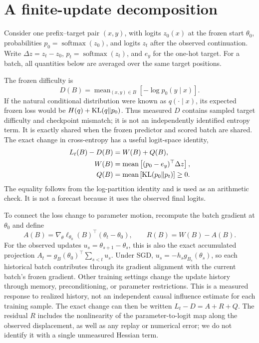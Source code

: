\section{A finite-update decomposition}

Consider one prefix--target pair \((x,y)\), with logits \(z_0(x)\) at the frozen start \(\theta_0\), probabilities \(p_0=\operatorname{softmax}(z_0)\), and logits \(z_t\) after the observed continuation.  Write \(\Delta z=z_t-z_0\), \(p_t=\operatorname{softmax}(z_t)\), and \(e_y\) for the one-hot target.  For a batch, all quantities below are averaged over the same target positions.

The frozen difficulty is
\begin{equation}
  D(B)=\operatorname{mean}_{(x,y)\in B}\left[-\log p_0(y\mid x)\right].
  \label{eq:difficulty}
\end{equation}
If the natural conditional distribution were known as \(q(\cdot\mid x)\), its expected frozen loss would be \(H(q)+\operatorname{KL}(q\Vert p_0)\).  Thus measured \(D\) contains sampled target difficulty and checkpoint mismatch; it is not an independently identified entropy term.  It is exactly shared when the frozen predictor and scored batch are shared.
The exact change in cross-entropy has a useful logit-space identity,
\begin{align}
  L_t(B)-D(B)&=W(B)+Q(B),\\
  W(B)&=\operatorname{mean}\left[(p_0-e_y)^\top\Delta z\right],\\
  Q(B)&=\operatorname{mean}\left[\operatorname{KL}(p_0\Vert p_t)\right]\geq 0.
  \label{eq:exact}
\end{align}
The equality follows from the log-partition identity and is used as an arithmetic check.  It is not a forecast because it uses the observed final logits.

To connect the loss change to parameter motion, recompute the batch gradient at \(\theta_0\) and define
\begin{equation}
  A(B)=\nabla_\theta\ell_{\theta_0}(B)^\top(\theta_t-\theta_0),
  \qquad R(B)=W(B)-A(B).
  \label{eq:work}
\end{equation}
For the observed updates \(u_s=\theta_{s+1}-\theta_s\), this is also the exact accumulated projection \(A_t=g_B(\theta_0)^\top\sum_{s<t}u_s\).  Under SGD, \(u_s=-h_s g_{B_s}(\theta_s)\), so each historical batch contributes through its gradient alignment with the current batch's frozen gradient.  Other training settings change the update history through memory, preconditioning, or parameter restrictions.  This is a measured response to realized history, not an independent causal influence estimate for each training sample.
The exact change can then be written \(L_t-D=A+R+Q\).  The residual \(R\) includes the nonlinearity of the parameter-to-logit map along the observed displacement, as well as any replay or numerical error; we do not identify it with a single unmeasured Hessian term.


